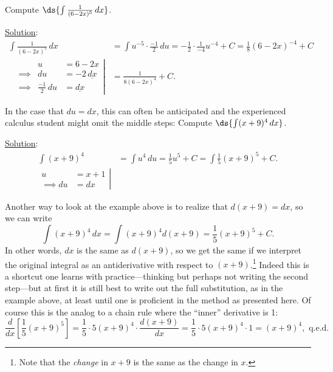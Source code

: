 \bex Compute $\ds{\int\frac1{(6-2x)^5}\,dx}$.

\underline{Solution}: 
\begin{align*}
\int\frac1{(6-2x)^5}\,dx&=\int u^{-5}\cdot\frac{-1}2\,du
   =-\frac12\cdot\frac1{-4}u^{-4}+C
   =\frac18(6-2x)^{-4}+C \\
\left.\begin{alignedat}{2}
&&u&=6-2x\\
&\implies&du&=-2\,\underline{dx}\\
&\implies&\frac{-1}2\,du&=\underline{dx}\end{alignedat}\right|&
=\frac1{8(6-2x)^4}+C.
\end{align*}
\eex

In the case that $du=dx$, this can often be anticipated and the
experienced calculus student might omit the middle steps:
%
\bex Compute $\ds{\int(x+9)^4\,dx}$.

\underline{Solution}:
\begin{align*}
\int(x+9)^4&=\int u^4\,du=\frac15u^5+C=\int\frac15(x+9)^5+C.
\\
\left.\begin{aligned}
u&=x+1\\
\implies du&=dx\end{aligned}\right|&
\end{align*}
\eex





Another way to look at the example above is to realize
that $d(x+9)=dx$, so we can write
$$\int(x+9)^4\,dx=\int(x+9)^4d(x+9)
                       =\frac15(x+9)^5+C.$$
In other words, $dx$ is the same as $d(x+9)$, so we get the same
if we interpret the original integral as an antiderivative with 
respect to $(x+9)$.\footnote{Note that the {\it change} in $x+9$ is the
same as the change in $x$.}  Indeed this is a shortcut one learns with
practice---thinking but perhaps not writing the second step---but 
at first it is still best to write out the full substitution,
as in the example above, at least until one is proficient in the 
method as presented here.  Of course this is the analog to 
a chain rule where the ``inner'' derivative is 1:
$$\frac{d}{dx}\left[\frac15(x+9)^5\right]
  =\frac15\cdot5(x+9)^4\cdot\frac{d(x+9)}{dx}
  =\frac15\cdot5(x+9)^4\cdot1=(x+9)^4,\text{ q.e.d.}$$



